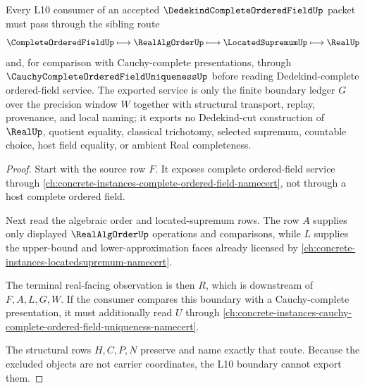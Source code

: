 \begin{theorem}
\label{thm:dedekind-complete-ordered-field-l10-boundary}
Every L10 consumer of an accepted $\DedekindCompleteOrderedFieldUp$ packet must pass through the sibling route
$$
\CompleteOrderedFieldUp \longmapsto \RealAlgOrderUp \longmapsto \LocatedSupremumUp \longmapsto \RealUp
$$
and, for comparison with Cauchy-complete presentations, through $\CauchyCompleteOrderedFieldUniquenessUp$ before reading Dedekind-complete ordered-field service. The exported service is only the finite boundary ledger $G$ over the precision window $W$ together with structural transport, replay, provenance, and local naming; it exports no Dedekind-cut construction of $\RealUp$, quotient equality, classical trichotomy, selected supremum, countable choice, host field equality, or ambient Real completeness.
\end{theorem}
\begin{proof}
Start with the source row $F$. It exposes complete ordered-field service through \autoref{ch:concrete-instances-complete-ordered-field-namecert}, not through a host complete ordered field.

Next read the algebraic order and located-supremum rows. The row $A$ supplies only displayed $\RealAlgOrderUp$ operations and comparisons, while $L$ supplies the upper-bound and lower-approximation faces already licensed by \autoref{ch:concrete-instances-locatedsupremum-namecert}.

The terminal real-facing observation is then $R$, which is downstream of $F,A,L,G,W$. If the consumer compares this boundary with a Cauchy-complete presentation, it must additionally read $U$ through \autoref{ch:concrete-instances-cauchy-complete-ordered-field-uniqueness-namecert}.

The structural rows $H,C,P,N$ preserve and name exactly that route. Because the excluded objects are not carrier coordinates, the L10 boundary cannot export them.
\end{proof}



